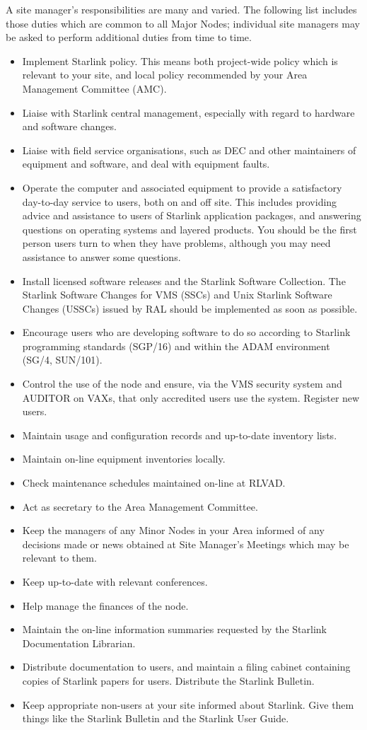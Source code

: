 A site manager's responsibilities are many and varied.
The following list includes those duties which are common to all Major Nodes;
individual site managers may be asked to perform additional duties from time to
time.
\begin{itemize}
\item Implement Starlink policy.
This means both project-wide policy which is relevant to your site, and local
policy recommended by your Area Management Committee (AMC).
\item Liaise with Starlink central management, especially with regard to
hardware and software changes.
\item Liaise with field service organisations, such as DEC and other
maintainers of equipment and software, and deal with equipment faults.
\item Operate the computer and associated equipment to provide a satisfactory
day-to-day service to users, both on and off site.
This includes providing advice and assistance to users of Starlink application
packages, and answering questions on operating systems and layered products.
You should be the first person users turn to when they have problems, although
you may need assistance to answer some questions.
\item Install licensed software releases and the Starlink Software Collection.
The Starlink Software Changes for VMS (SSCs) and Unix Starlink Software Changes
(USSCs) issued by RAL should be implemented as soon as possible.
\item Encourage users who are developing software to do so according to Starlink
programming standards (SGP/16) and within the ADAM environment (SG/4, SUN/101).
\item Control the use of the node and ensure, via the VMS security system and
AUDITOR on VAXs, that only accredited users use the system.
Register new users.
\item Maintain usage and configuration records and up-to-date inventory lists.
\item Maintain on-line equipment inventories locally.
\item Check maintenance schedules maintained on-line at RLVAD.
\item Act as secretary to the Area Management Committee.
\item Keep the managers of any Minor Nodes in your Area informed of any
decisions made or news obtained at Site Manager's Meetings which may be
relevant to them.
\item Keep up-to-date with relevant conferences.
\item Help manage the finances of the node.
\item Maintain the on-line information summaries requested by the Starlink
Documentation Librarian.
\item Distribute documentation to users, and maintain a filing cabinet
containing copies of Starlink papers for users.
Distribute the Starlink Bulletin.
\item Keep appropriate non-users at your site informed about Starlink.
Give them things like the Starlink Bulletin and the Starlink User Guide.
\end{itemize}
